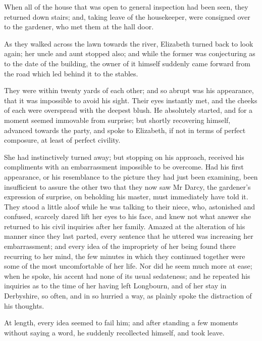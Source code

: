 When all of the house that was open to general inspection had been seen, they returned down stairs; and, taking leave of the housekeeper, were consigned over to the gardener, who met them at the hall door.

As they walked across the lawn towards the river, Elizabeth turned back to look again; her uncle and aunt stopped also; and while the former was conjecturing as to the date of the building, the owner of it himself suddenly came forward from the road which led behind it to the stables.

They were within twenty yards of each other; and so abrupt was his appearance, that it was impossible to avoid his sight. Their eyes instantly met, and the cheeks of each were overspread with the deepest blush. He absolutely started, and for a moment seemed immovable from surprise; but shortly recovering himself, advanced towards the party, and spoke to Elizabeth, if not in terms of perfect composure, at least of perfect civility.

She had instinctively turned away; but stopping on his approach, received his compliments with an embarrassment impossible to be overcome. Had his first appearance, or his resemblance to the picture they had just been examining, been insufficient to assure the other two that they now saw Mr Darcy, the gardener's expression of surprise, on beholding his master, must immediately have told it. They stood a little aloof while he was talking to their niece, who, astonished and confused, scarcely dared lift her eyes to his face, and knew not what answer she returned to his civil inquiries after her family. Amazed at the alteration of his manner since they last parted, every sentence that he uttered was increasing her embarrassment; and every idea of the impropriety of her being found there recurring to her mind, the few minutes in which they continued together were some of the most uncomfortable of her life. Nor did he seem much more at ease; when he spoke, his accent had none of its usual sedateness; and he repeated his inquiries as to the time of her having left Longbourn, and of her stay in Derbyshire, so often, and in so hurried a way, as plainly spoke the distraction of his thoughts.

At length, every idea seemed to fail him; and after standing a few moments without saying a word, he suddenly recollected himself, and took leave.


